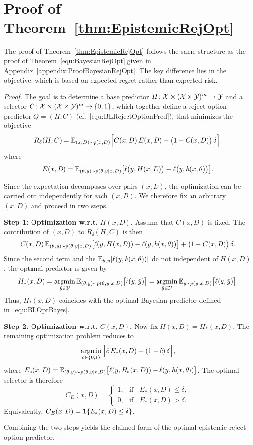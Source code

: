 \section{Proof of Theorem~\ref{thm:EpistemicRejOpt}}
\label{appendix:ProofOfEpistemicTheorem}

The proof of Theorem~\ref{thm:EpistemicRejOpt} follows the same structure as the proof of Theorem~\ref{equ:BayesianRejOpt} given in Appendix~\ref{appendix:ProofBayesianRejOpt}. The key difference lies in the objective, which is based on expected regret rather than expected risk.

\begin{proof}
The goal is to determine a base predictor
\(H \colon {\cal X} \times ({\cal X} \times {\cal Y})^m \rightarrow {\cal Y}\)
and a selector
\(C \colon {\cal X} \times ({\cal X} \times {\cal Y})^m \rightarrow \{0,1\}\),
which together define a reject-option predictor
\(Q = (H,C)\) (cf.~\eqref{equ:BLRejectOptionPred}),
that minimizes the objective
\[
R_{\delta}(H,C)
=
{\mathbb{E}}_{(x,D)\sim p(x,D)}
\Big[
C(x,D)\,E(x,D)
+
\bigl(1 - C(x,D)\bigr)\,\delta
\Big],
\]
where
\[
E(x,D)
=
{\mathbb{E}}_{(\theta,y)\sim p(\theta,y \mid x,D)}
\bigl[
\ell\bigl(y, H(x,D)\bigr)
-
\ell\bigl(y, h(x,\theta)\bigr)
\bigr].
\]

Since the expectation decomposes over pairs \((x,D)\), the optimization can be carried out independently for each \((x,D)\).
We therefore fix an arbitrary \((x,D)\) and proceed in two steps.

\medskip
\noindent
\textbf{Step 1: Optimization w.r.t. \(H(x,D)\).}
Assume that \(C(x,D)\) is fixed.
The contribution of \((x,D)\) to \(R_{\delta}(H,C)\) is then
\[
C(x,D)\,
{\mathbb{E}}_{(\theta,y)\sim p(\theta,y \mid x,D)}
\bigl[
\ell(y,H(x,D)) - \ell(y,h(x,\theta))
\bigr]
+
\bigl(1 - C(x,D)\bigr)\,\delta .
\]
Since the second term and the \({\mathbb{E}}_{\theta,y}[\ell(y,h(x,\theta))]\) do not independent of \(H(x,D)\),
the optimal predictor is given by
\[
H_*(x,D)
=
\mathop{\rm argmin}_{\hat y \in {\cal Y}}
{\mathbb{E}}_{(\theta,y)\sim p(\theta,y \mid x,D)}
\bigl[
\ell(y,\hat y)
\bigr]
=
\mathop{\rm argmin}_{\hat y \in {\cal Y}}
{\mathbb{E}}_{y\sim p(y \mid x,D)}
\bigl[
\ell(y,\hat y)
\bigr].
\]
Thus, \(H_*(x,D)\) coincides with the optimal Bayesian predictor defined in~\eqref{equ:BLOptBayes}.

\medskip
\noindent
\textbf{Step 2: Optimization w.r.t. \(C(x,D)\).}
Now fix \(H(x,D) = H_*(x,D)\).
The remaining optimization problem reduces to
\[
\mathop{\rm argmin}_{\hat c \in \{0,1\}}
\Big[
\hat c\,E_*(x,D)
+
(1-\hat c)\,\delta
\Big],
\]
where
\(
E_*(x,D)
=
{\mathbb{E}}_{(\theta,y)\sim p(\theta,y \mid x,D)}
\bigl[
\ell(y,H_*(x,D)) - \ell(y,h(x,\theta))
\bigr]
\).
The optimal selector is therefore
\[
C_E(x,D)
=
\begin{cases}
1, & \text{if }\;\; E_*(x,D) \le \delta, \\
0, & \text{if }\;\; E_*(x,D) > \delta .
\end{cases}
\]
Equivalently,
\(C_E(x,D) = \mathbf{1}{\{ {E_*(x,D) \le \delta}\}}\).

Combining the two steps yields the claimed form of the optimal epistemic reject-option predictor.

\end{proof}


